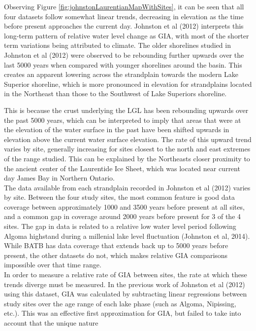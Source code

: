 \documentclass{article}
\begin{document}
 
 Observing Figure \ref{fig:johnstonLaurentianMapWithSites}, it can be seen that
 all four datasets follow somewhat
 linear trends, decreasing in elevation as the time before present approaches the
 current day. Johnston et al (2012) interprets this long-term pattern of relative
 water level change as GIA, with most of the shorter term variations being attributed
 to climate. The older shorelines studied in Johnston et al (2012) were observed
 to be rebounding further upwards over the last 5000 years when compared with
 younger shorelines around the basin. This creates an apparent lowering across
 the strandplain towards the modern Lake Superior shoreline, which is more pronounced
 in elevation for strandplains located in the Northeast than those to the Southwest
 of Lake Superiors shoreline.
 
 This is because the crust underlying the LGL has been rebounding upwards
 over the past 5000 years, which can be interpreted to imply that areas that were at the
 elevation of the water surface in the past have been shifted upwards in elevation
 above the current water surface elevation. The rate of this upward trend varies
 by site, generally increasing for sites closest to the north and east extremes
 of the range studied. This can be explained by the Northeasts closer proximity to 
 the ancient center of the Laurentide Ice Sheet, which was located near current day
 James Bay in Northern Ontario.\\
 The data available from each strandplain recorded in Johnston et al (2012) varies
 by site. Between the four study sites, the most common feature is good data coverage between
 approximately 1000 and 3500 years before present at all sites, and a common gap in coverage around 2000
 years before present for 3 of the 4 sites. The gap in data is related to a 
 relative low water level period following Algoma highstand during a millenial lake level fluctuation
 (Johnston et al, 2014). While BATB has data
 coverage that extends back up to 5000 years before present, the other datasets do not, which makes relative GIA
 comparisons impossible over that time range.\\ 
 In order to measure a relative rate of GIA between sites, the rate at which these
 trends diverge must be measured. In the previous work of Johnston et al (2012) 
 using this dataset, GIA was calculated by subtracting linear regressions between
 study sites over the age range of each lake phase (such as Algoma, Nipissing, etc.). This was an
 effective first approximation for GIA, but failed to take into account that the unique nature
\end{document}

